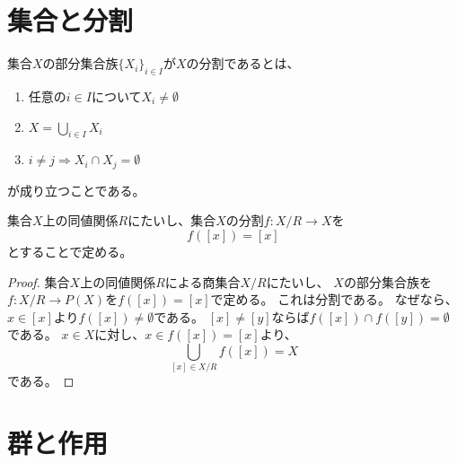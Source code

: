 %

\chapter{集合と分割}

\begin{definition}
    \label{decomposition-def}
    \leanok    
    集合$X$の部分集合族$\{X_i\}_{i\in I}$が$X$の分割であるとは、
    \begin{enumerate}
        \item 任意の$i\in I$について$X_i\neq\emptyset$
        \item $X=\bigcup_{i\in I}X_i$
        \item $i\neq j\Rightarrow X_i\cap X_j=\emptyset$
    \end{enumerate}
    が成り立つことである。
\end{definition}

\begin{proposition}\label{equivrel-to-decomp}
    \leanok
    集合$X$上の同値関係$R$にたいし、集合$X$の分割$f:X/R \to X$を
    $$f([x])=[x]$$とすることで定める。
\end{proposition}

\begin{proof}
    \leanok
    集合$X$上の同値関係$R$による商集合$X/R$にたいし、
    $X$の部分集合族を$f:X/R\to P(X)$を$f([x])=[x]$で定める。
    これは分割である。
    なぜなら、
    $x\in [x]$より$f([x])\neq\emptyset$である。
    $[x]\neq[y]$ならば$f([x])\cap f([y])=\emptyset$である。
    $x\in X$に対し、$x\in f([x])=[x]$より、
    $$\bigcup_{[x]\in X/R}f([x])=X$$である。
\end{proof}

\chapter{群と作用}

